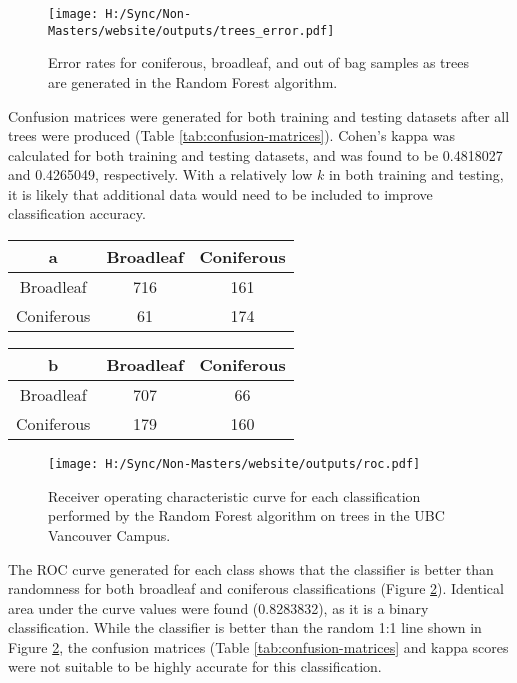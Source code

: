 \documentclass[
]{article}
\begin{document}
\begin{figure}
\centering
\texttt{[image: H:/Sync/Non-Masters/website/outputs/trees\_error.pdf]}
\caption{\label{fig:unnamed-chunk-4}\label{fig:error-lines} Error rates for coniferous, broadleaf, and out of bag samples as trees are generated in the Random Forest algorithm.}
\end{figure}

Confusion matrices were generated for both training and testing datasets after all trees were produced (Table \ref{tab:confusion-matrices}). Cohen's kappa was calculated for both training and testing datasets, and was found to be 0.4818027 and 0.4265049, respectively. With a relatively low \(k\) in both training and testing, it is likely that additional data would need to be included to improve classification accuracy.

\begin{table}
\caption{\label{tab:unnamed-chunk-5}\label{tab:confusion-matrices}Confusion matrices for testing (a) and training (b) datasets using the Random Forest classifier on LiDAR data on the UBC Vancouver Campus.}

\begin{longtable}[t]{ccc}
\toprule
a & Broadleaf & Coniferous\\
\midrule
Broadleaf & 716 & 161\\
Coniferous & 61 & 174\\
\bottomrule
\end{longtable}
\begin{longtable}[t]{ccc}
\toprule
b & Broadleaf & Coniferous\\
\midrule
Broadleaf & 707 & 66\\
Coniferous & 179 & 160\\
\bottomrule
\end{longtable}
\end{table}

\begin{figure}
\centering
\texttt{[image: H:/Sync/Non-Masters/website/outputs/roc.pdf]}
\caption{\label{fig:unnamed-chunk-6}\label{fig:roc-auc} Receiver operating characteristic curve for each classification performed by the Random Forest algorithm on trees in the UBC Vancouver Campus.}
\end{figure}

The ROC curve generated for each class shows that the classifier is better than randomness for both broadleaf and coniferous classifications (Figure \ref{fig:roc-auc}). Identical area under the curve values were found (0.8283832), as it is a binary classification. While the classifier is better than the random 1:1 line shown in Figure \ref{fig:roc-auc}, the confusion matrices (Table \ref{tab:confusion-matrices} and kappa scores were not suitable to be highly accurate for this classification.
\end{document}
